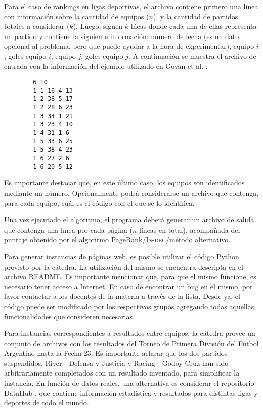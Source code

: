         Para el caso de rankings en ligas deportivas, el archivo contiene primero una l\'inea con informaci\'on sobre la cantidad de equipos ($n$), y la cantidad de partidos totales a considerar ($k$). Luego, siguen $k$ l\'neas donde cada una de ellas representa un partido y contiene la siguiente informaci\'on: n\'umero de fecha (es un dato opcional al problema, pero que puede ayudar a la hora de experimentar), equipo $i$, goles equipo $i$, equipo $j$, goles equipo $j$. A continuaci\'on se muestra el archivo de entrada con la informaci\'on del ejemplo utilizado en Govan et al. \cite{Govan2008}:

        \begin{verbatim}
        6 10
        1 1 16 4 13
        1 2 38 5 17
        1 2 28 6 23
        1 3 34 1 21
        1 3 23 4 10
        1 4 31 1 6
        1 5 33 6 25
        1 5 38 4 23
        1 6 27 2 6
        1 6 20 5 12
        \end{verbatim}

        Es importante destacar que, en este \'ultimo caso, los equipos son identificados mediante un n\'umero. Opcionalmente podr\'a considerarse un archivo que contenga, para cada equipo, cu\'al es el c\'odigo con el que se lo identifica.

        Una vez ejecutado el algoritmo, el programa deber\'a generar un archivo de salida que contenga una l\'inea por cada p\'agina ($n$ l\'ineas en total), acompa\~nada del puntaje obtenido por el algoritmo PageRank/\textsc{In-deg}/m\'etodo alternativo. 

        Para generar instancias de p\'aginas web, es posible utilizar el c\'odigo Python provisto por la c\'atedra. La utilizaci\'on del mismo se encuentra descripta en el archivo README. Es importante mencionar que, para que el mismo funcione, es necesario tener acceso a Internet. En caso de encontrar un bug en el mismo, por favor contactar a los docentes de la materia a trav\'es de la lista. Desde ya, el c\'odigo puede ser modificado por los respectivos grupos agregando todas aquellas funcionalidades que consideren necesarias.

        Para instancias correspondientes a resultados entre equipos, la c\'atedra provee un conjunto de archivos con los resultados del Torneo de Primera Divisi\'on del F\'utbol Argentino hasta la Fecha 23. Es importante aclarar que los dos partidos suspendidos, River - Defensa y Justicia y Racing - Godoy Cruz han sido arbitrariamente completados con un resultado inventado, para simplificar la instancia. En funci\'on de datos reales, una alternativa es considerar el repositorio DataHub \cite{datahub}, que contiene informaci\'on estad\'istica y resultados para distintas ligas y deportes de todo el mundo.

